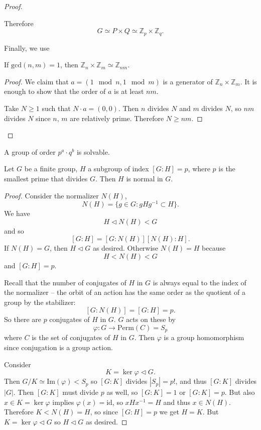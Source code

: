 \begin{proof}
\begin{enumerate}
{      Therefore
      $$
      G \simeq P \times Q \simeq \mathbb{Z}_p \times \mathbb{Z}_q.
      $$

      Finally, we use
      \begin{lemma}
        If $\mathrm{gcd}(n, m) = 1$, then
        $\mathbb{Z}_n \times \mathbb{Z}_m \simeq \mathbb{Z}_{nm}$.
      \end{lemma}
      \begin{proof}
        We claim that $a = (1 \mod n, 1 \mod m)$ is a generator of
        $\mathbb{Z}_n \times \mathbb{Z}_m$. It is enough to show that
        the order of $a$ is at least $nm$.

        Take $N \geq 1$ such that $N \cdot a = (0, 0)$. Then
        $n$ divides $N$ and $m$ divides $N$, so $nm$ divides $N$ since
        $n$, $m$ are relatively prime. Therefore $N \geq n m$.
      \end{proof}
    }
  \end{enumerate}
\end{proof}

\begin{theorem}
  A group of order $p^a \cdot q^b$ is solvable.
\end{theorem}

\begin{prop}
  Let $G$ be a finite group, $H$ a subgroup of index
  $[G : H] = p$, where $p$ is the smallest prime that divides
  $G$. Then $H$ is normal in $G$.
\end{prop}
\begin{proof}
  Consider the normalizer $N(H)$,
  $$
  N(H) = \{ g \in G :  gHg^{-1} \subset H \}.
  $$
  We have
  $$
  H \triangleleft N(H) < G
  $$
  and so
  $$
  [G : H] = [G : N(H)] [N(H) : H].
  $$
  If $N(H) = G$, then $H \triangleleft G$ as desired.
  Otherwise $N(H) = H$ because
  $$
  H < N(H) < G
  $$
  and $[G : H] = p$.

  Recall that the number of conjugates of $H$ in $G$ is always equal
  to the index of the normalizer -- the orbit of an action has the
  same order as the quotient of a group by the stabilizer:
  $$
  [G : N(H)] = [G : H] = p.
  $$
  So there are $p$ conjugates of $H$ in $G$. $G$ acts on these by
  $$
  \varphi : G \to \mathrm{Perm}(C) = S_p
  $$
  where $C$ is the set of conjugates of $H$ in $G$. Then $\varphi$ is
  a group homomorphism since conjugation is a group action.

  Consider
  $$
  K = \ker \varphi \triangleleft G.
  $$
  Then $G / K \simeq \mathrm{Im}(\varphi) < S_p$ so
  $[G : K]$ divides $|S_p| = p!$, and thus $[G : K]$ divides $|G|$.
  Then $[G:K]$ must divide $p$ as well, so $[G : K] = 1$ or
  $[G : K] = p$. But also $x \in K = \ker \varphi$ implies
  $\varphi(x) = \mathrm{id}$, so $x H x^{-1} = H$ and thus
  $x \in N(H)$. Therefore $K < N(H) = H$, so since
  $[G : H] = p$ we get $H = K$. But
  $K = \ker \varphi \triangleleft G$ so $H \triangleleft G$ as desired.
\end{proof}

